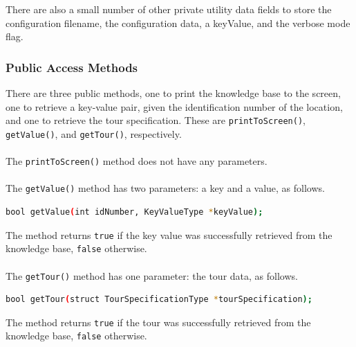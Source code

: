 \documentclass{CSSRforAfrica}
\begin{document}
\noindent
There are also a small number of other private utility data fields to store the configuration filename, the configuration data, a keyValue, and the verbose mode flag.


\newpage
\subsubsection{Public Access Methods}
There are three public methods, one to print the knowledge base to the screen,  one to retrieve a key-value pair, given the identification number of the  location, and one to retrieve the tour specification. These are {\small \tt printToScreen()},  {\small \tt getValue()}, and  {\small \tt getTour()}, respectively.
~\\~\\
The {\small \tt printToScreen()} method does not have any parameters.
~\\~\\
The  {\small \tt getValue()}  method has two parameters: a key and a value, as follows.

\begin{lstlisting}[style=withoutNumbering, language=bash] 
bool getValue(int idNumber, KeyValueType *keyValue);
\end{lstlisting}

\noindent The method returns {\small \tt true} if the key value was successfully retrieved from the knowledge base, {\small \tt false} otherwise.
~\\~\\
The  {\small \tt getTour()}  method has one parameter: the tour data, as follows.

\begin{lstlisting}[style=withoutNumbering, language=bash] 
bool getTour(struct TourSpecificationType *tourSpecification);
\end{lstlisting}

\noindent The method returns {\small \tt true} if the  tour was successfully retrieved from the knowledge base, {\small \tt false} otherwise.


 \newpage
\end{document}
